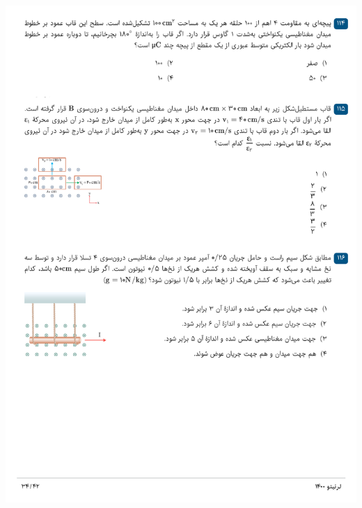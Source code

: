 \documentclass{book}
\begin{document}
\includegraphics[width=\textwidth]{"pages/34"}
\end{document}
